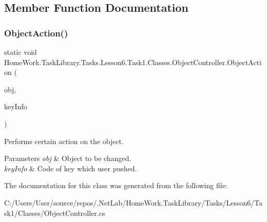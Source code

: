 \subsection{Member Function Documentation}
\mbox{\label{class_home_work_1_1_task_library_1_1_tasks_1_1_lesson6_1_1_task1_1_1_classes_1_1_object_controller_a37101260e317a354744d66c03bbec0a5}} 
\subsubsection{\texorpdfstring{ObjectAction()}{ObjectAction()}}
{\footnotesize\ttfamily static void Home\+Work.\+Task\+Library.\+Tasks.\+Lesson6.\+Task1.\+Classes.\+Object\+Controller.\+Object\+Action (\begin{DoxyParamCaption}\item[{\mbox{\hyperlink{interface_home_work_1_1_task_library_1_1_tasks_1_1_lesson6_1_1_task1_1_1_interfaces_1_1_i_changeable}{I\+Changeable}}}]{obj,  }\item[{int}]{key\+Info }\end{DoxyParamCaption})\hspace{0.3cm}{\ttfamily [static]}}



Performs certain action on the object. 


\begin{DoxyParams}{Parameters}
{\em obj} & Object to be changed.\\
\hline
{\em key\+Info} & Code of key which user pushed.\\
\hline
\end{DoxyParams}


The documentation for this class was generated from the following file\+:\begin{DoxyCompactItemize}
\item 
C\+:/\+Users/\+User/source/repos/.\+Net\+Lab/\+Home\+Work.\+Task\+Library/\+Tasks/\+Lesson6/\+Task1/\+Classes/Object\+Controller.\+cs\end{DoxyCompactItemize}
